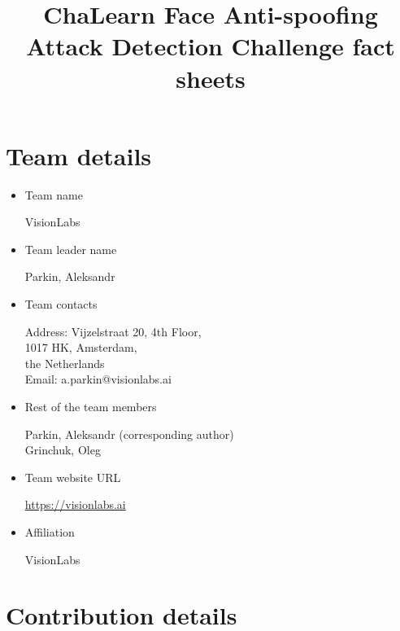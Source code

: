 \documentclass{article}
\title{ChaLearn Face Anti-spoofing Attack Detection Challenge fact sheets}
\begin{document}
\maketitle

\section{Team details}

\begin{itemize}
\item Team name

VisionLabs

\item Team leader name

Parkin, Aleksandr

\item Team contacts

Address: Vijzelstraat 20, 4th Floor,\\
1017 HK, Amsterdam,\\
the Netherlands\\
Email: a.parkin@visionlabs.ai

\item Rest of the team members

Parkin, Aleksandr (corresponding author)\\
Grinchuk, Oleg


\item Team website URL

\url{https://visionlabs.ai}

\item Affiliation

VisionLabs

\end{itemize}

\section{Contribution details}
\end{document}
